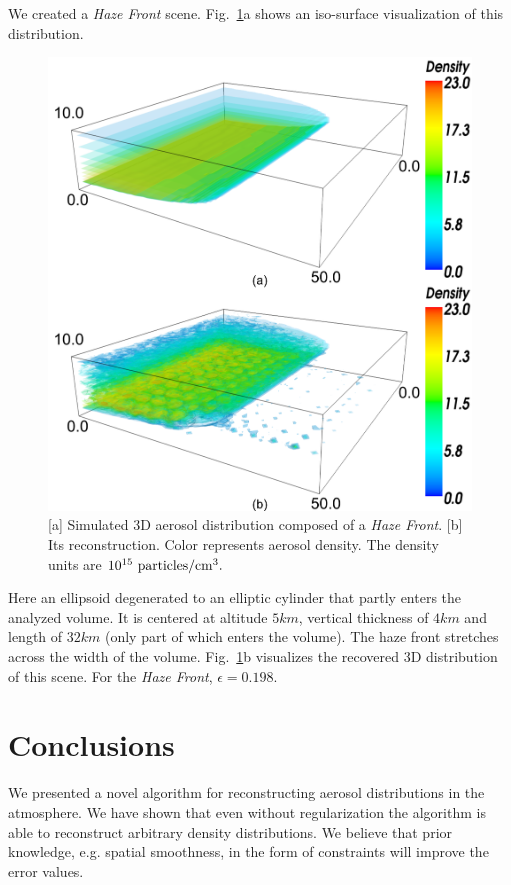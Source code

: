 \documentclass[10pt,twocolumn,letterpaper]{article}
\newcommand{\yoavcomment}[1]{}
\renewcommand{\yoavcomment}[1]{#1} %
\begin{document}
We created a {\em Haze Front} scene. Fig.~\ref{fig:simulation2}a shows an iso-surface visualization of this distribution.
\begin{figure}
  \centering
  \yoavcomment{\includegraphics[width=\columnwidth]{images/simulation2}}
  \caption{\small [a] Simulated 3D aerosol distribution composed of a {\em Haze Front}. [b] Its reconstruction. Color represents aerosol density. The density units are
  $10^{15}~{\rm particles}/{\rm cm}^3.$}
  \label{fig:simulation2}
\end{figure}
Here an ellipsoid degenerated to an elliptic cylinder that partly enters the analyzed volume. It is centered at altitude $5km$, vertical thickness of $4km$ and length of $32km$ (only part of which enters the volume). The haze front stretches across the width of the volume.  
Fig.~\ref{fig:simulation2}b visualizes the recovered 3D distribution of this scene. For the {\em Haze Front}, $\epsilon=0.198$.


\section{Conclusions}
\label{sec:conclusions}

We presented a novel algorithm for reconstructing aerosol distributions
in the atmosphere. We have shown that even without regularization the
algorithm is able to reconstruct arbitrary density distributions.
We believe that prior knowledge, e.g. spatial smoothness, in the form
of constraints will improve the error values.
\end{document}
